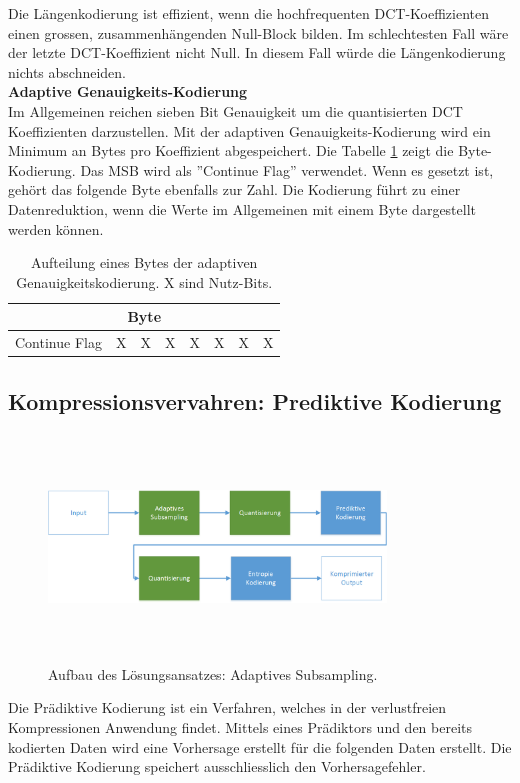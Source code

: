 Die Längenkodierung ist effizient, wenn die hochfrequenten DCT-Koeffizienten einen grossen, zusammenhängenden Null-Block bilden. Im schlechtesten Fall wäre der letzte DCT-Koeffizient nicht Null. In diesem Fall würde die Längenkodierung nichts abschneiden.\\

\textbf{Adaptive Genauigkeits-Kodierung}\\
Im Allgemeinen reichen sieben Bit Genauigkeit um die quantisierten DCT Koeffizienten darzustellen. Mit der adaptiven Genauigkeits-Kodierung wird ein Minimum an Bytes pro Koeffizient abgespeichert. Die Tabelle \ref{konzept:loesung1:entropie:adaptive} zeigt die Byte-Kodierung. Das MSB wird als ''Continue Flag'' verwendet. Wenn es gesetzt ist, gehört das folgende Byte ebenfalls zur Zahl. Die Kodierung führt zu einer Datenreduktion, wenn die Werte im Allgemeinen mit einem Byte dargestellt werden können.

\begin{table}[!htbp]
	\center
	\begin{tabular}{|c|c|c|c||c|c|c|c|}
	\hline
	\multicolumn{8}{|c|}{Byte}\\\hline
	Continue Flag & X & X & X & X & X & X & X \\\hline
	\end{tabular}
	\caption{Aufteilung eines Bytes der adaptiven Genauigkeitskodierung. X sind Nutz-Bits.}
	\label{konzept:loesung1:entropie:adaptive}
\end{table}
\pagebreak

\subsection{Kompressionsvervahren: Prediktive Kodierung} \label{konzept:prediktiv}
\begin{figure}[!htbp]
	\center
	\includegraphics[width=0.8\textwidth,height=6cm,keepaspectratio]{./pictures/konzept/solution2/aufbau.png}
	\caption{Aufbau des Lösungsansatzes: Adaptives Subsampling.}
	\label{konzept:loesung2:aufbau}
\end{figure}
Die Prädiktive Kodierung ist ein Verfahren, welches in der verlustfreien Kompressionen Anwendung findet. Mittels eines Prädiktors und den bereits kodierten Daten wird eine Vorhersage erstellt für die folgenden Daten erstellt. Die Prädiktive Kodierung speichert ausschliesslich den Vorhersagefehler.

